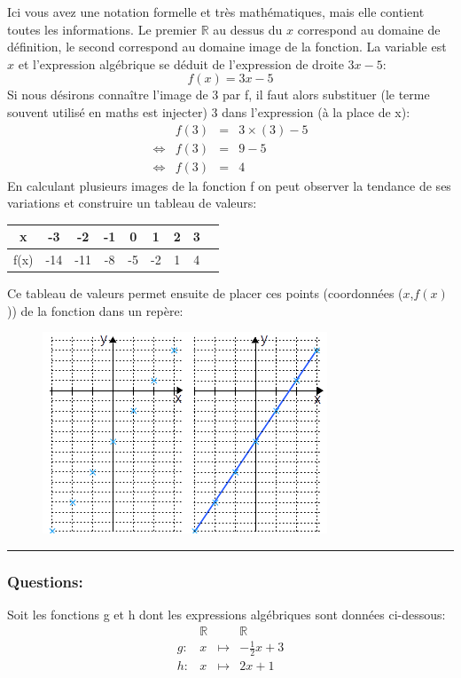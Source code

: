 \documentclass[11pt, french]{article}
\begin{document}
Ici vous avez une notation formelle et très mathématiques, mais elle contient toutes les informations. Le premier $\mathbb{R}$ au dessus du $x$ correspond au domaine de définition, le second correspond au domaine image de la fonction.
La variable est $x$ et l'expression algébrique se déduit de l'expression de droite $3x-5$:
$$
f(x) = 3x-5
$$
Si nous désirons connaître l'image de 3 par f, il faut alors substituer (le terme souvent utilisé en maths est injecter) 3 dans l'expression (à la place de x):
\begin{equation}\nonumber
\begin{matrix}
& f(3) & = & 3\times(3) - 5 \\
\Leftrightarrow & f(3) & = & 9 - 5 \\
\Leftrightarrow & f(3) & = & 4
\end{matrix}
\end{equation}
En calculant plusieurs images de la fonction f on peut observer la tendance de ses variations et construire un tableau de valeurs:
\begin{table}[!h]
\center
\begin{tabular}{|c|c|c|c|c|c|c|c|c|}
\hline
  x   & -3  & -2 &-1 &  0 &  1 & 2 & 3  \\ \hline
 f(x) &-14 &-11 &-8 & -5 & -2 & 1 & 4  \\ \hline
\end{tabular}
\end{table}

Ce tableau de valeurs permet ensuite de placer ces points (coordonnées ($x$,$f(x)$)) de la fonction dans un repère:

\begin{figure}[!h]
\center
\includegraphics[scale=0.9]{assets/serie_1_exo_2_figure_1.png}
\label{fig:p_s_1_exo2-fig1}
\end{figure}

\noindent\rule{\textwidth}{1pt}

\subsubsection*{Questions:}
Soit les fonctions g et h dont les expressions algébriques sont données ci-dessous:
\begin{equation}\nonumber
\begin{matrix}
& \mathbb{R} & & \mathbb{R} \\
g : & x & \mapsto & -\frac{1}{2}x + 3\\
h : & x & \mapsto & 2x + 1\\
\end{matrix}
\end{equation}
\end{document}
